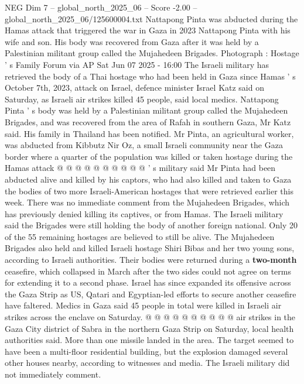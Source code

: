 \begin{textsample}{NEG Dim 7 – global\_north\_2025\_06 – Score -2.00 – global\_north\_2025\_06/125600004.txt}  \label{ex:f7_neg_080}
Nattapong Pinta was abducted during the Hamas attack that triggered the war in Gaza in 2023 Nattapong Pinta with his wife and son.
His body was recovered from Gaza after it was held by a Palestinian militant group called the Mujahedeen Brigades.
Photograph : Hostage ' s Family Forum via AP Sat Jun 07 2025 - 16:00 The Israeli military has retrieved the body of a Thai hostage who had been held in Gaza since Hamas ' s October 7th, 2023, attack on Israel, defence minister Israel Katz said on Saturday, as Israeli air strikes killed 45 people, said local medics.
Nattapong Pinta ' s body was held by a Palestinian militant group called the Mujahedeen Brigades, and was recovered from the area of Rafah in southern Gaza, Mr Katz said.
His family in Thailand has been notified.
Mr Pinta, an agricultural worker, was abducted from Kibbutz Nir Oz, a small Israeli community near the Gaza border where a quarter of the population was killed or taken hostage during the Hamas attack @ @ @ @ @ @ @ @ @ @ ' s military said Mr Pinta had been abducted alive and killed by his captors, who had also killed and taken to Gaza the bodies of two more Israeli-American hostages that were retrieved earlier this week.
There was no immediate comment from the Mujahedeen Brigades, which has previously denied killing its captives, or from Hamas.
The Israeli military said the Brigades were still holding the body of another foreign national.
Only 20 of the 55 remaining hostages are believed to still be alive.
The Mujahedeen Brigades also held and killed Israeli hostage Shiri Bibas and her two young sons, according to Israeli authorities.
Their bodies were returned during a \textbf{two-month} ceasefire, which collapsed in March after the two sides could not agree on terms for extending it to a second phase.
Israel has since expanded its offensive across the Gaza Strip as US, Qatari and Egyptian-led efforts to secure another ceasefire have faltered.
Medics in Gaza said 45 people in total were killed in Israeli air strikes across the enclave on Saturday. @ @ @ @ @ @ @ @ @ @ air strikes in the Gaza City district of Sabra in the northern Gaza Strip on Saturday, local health authorities said.
More than one missile landed in the area.
The target seemed to have been a multi-floor residential building, but the explosion damaged several other houses nearby, according to witnesses and media.
The Israeli military did not immediately comment.

\end{textsample}
